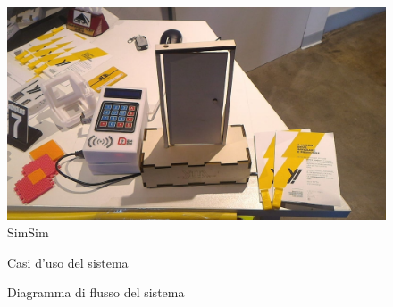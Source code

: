 \documentclass[12pt]{report}
\begin{document}
\begin{figure}
	\includegraphics[width=1\linewidth]{./img/simsim.jpeg}
	\caption{SimSim}
	\label{fig:simsim}
\end{figure}

\begin{figure}
	\caption{Casi d'uso del sistema}
	\label{fig:usecase}
\end{figure}

\begin{figure}
	\caption{Diagramma di flusso del sistema}
	\label{fig:flowchart}
\end{figure}
\end{document}
